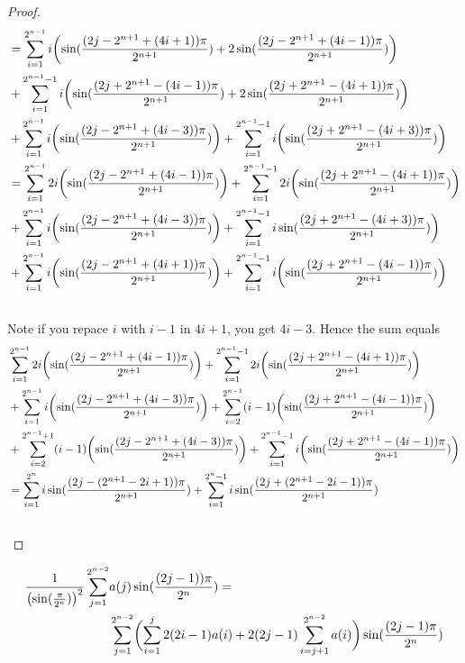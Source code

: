 \documentclass[fleqn,a4paper,9pt]{article}
\begin{document}
\begin{flushleft}
\begin{proof}
\begin{align}
&=\sum_{i=1}^{2^{n-1}}i\biggl(\sin(\frac{(2j-2^{n+1}+(4i+1))\pi}{2^{n+1}})+2\sin(\frac{(2j-2^{n+1}+(4i-1))\pi}{2^{n+1}})\biggr)\\\notag
&+\sum_{i=1}^{2^{n-1}-1}i\biggl(\sin(\frac{(2j+2^{n+1}-(4i-1))\pi}{2^{n+1}})+2\sin(\frac{(2j+2^{n+1}-(4i+1))\pi}{2^{n+1}})\biggr)\\\notag
&+\sum_{i=1}^{2^{n-1}}i\biggl(\sin(\frac{(2j-2^{n+1}+(4i-3))\pi}{2^{n+1}})\biggr)+\sum_{i=1}^{2^{n-1}-1}i\biggl(\sin(\frac{(2j+2^{n+1}-(4i+3))\pi}{2^{n+1}})\biggr)\\\notag
&=\sum_{i=1}^{2^{n-1}}2i\biggl(\sin(\frac{(2j-2^{n+1}+(4i-1))\pi}{2^{n+1}})\biggr)+\sum_{i=1}^{2^{n-1}-1}2i\biggl(\sin(\frac{(2j+2^{n+1}-(4i+1))\pi}{2^{n+1}})\biggr)\\\notag
&+\sum_{i=1}^{2^{n-1}}i\biggl(\sin(\frac{(2j-2^{n+1}+(4i-3))\pi}{2^{n+1}})\biggr)+\sum_{i=1}^{2^{n-1}-1}i\sin(\frac{(2j+2^{n+1}-(4i+3))\pi}{2^{n+1}})\biggr)\\\notag
&+\sum_{i=1}^{2^{n-1}}i\biggl(\sin(\frac{(2j-2^{n+1}+(4i+1))\pi}{2^{n+1}})\biggr)+\sum_{i=1}^{2^{n-1}-1}i\biggl(\sin(\frac{(2j+2^{n+1}-(4i-1))\pi}{2^{n+1}})\biggr)\\\notag
\end{align}
Note if you repace $i$ with $i-1$ in $4i+1$, you get $4i-3$. 
Hence the sum equals
\begin{align}
&\sum_{i=1}^{2^{n-1}}2i\biggl(\sin(\frac{(2j-2^{n+1}+(4i-1))\pi}{2^{n+1}})\biggr)+\sum_{i=1}^{2^{n-1}-1}2i\biggl(\sin(\frac{(2j+2^{n+1}-(4i+1))\pi}{2^{n+1}})\biggr)\\\notag
&+\sum_{i=1}^{2^{n-1}}i\biggl(\sin(\frac{(2j-2^{n+1}+(4i-3))\pi}{2^{n+1}})\biggr)+\sum_{i=2}^{2^{n-1}}(i-1)\biggl(\sin(\frac{(2j+2^{n+1}-(4i-1))\pi}{2^{n+1}})\biggr)\\\notag
&+\sum_{i=2}^{2^{n-1}+1}(i-1)\biggl(\sin(\frac{(2j-2^{n+1}+(4i-3))\pi}{2^{n+1}})\biggr)+\sum_{i=1}^{2^{n-1}-1}i\biggl(\sin(\frac{(2j+2^{n+1}-(4i-1))\pi}{2^{n+1}})\biggr)\\\notag
&=\sum_{i=1}^{2^{n}}i\sin(   \frac{(2j-(2^{n+1}-2i+1))\pi}{2^{n+1}}  )+\sum_{i=1}^{2^{n}-1}i\sin(   \frac{(2j+(2^{n+1}-2i-1))\pi}{2^{n+1}}  )\\\notag
\end{align}
\end{proof}
\begin{corollary}
\begin{align}
\frac{1}{\left(\sin(\frac{\pi}{2^n})\right)^2}\sum_{j=1}^{2^{n-2}}&a(j)\sin(\frac{(2j-1))\pi}{2^n})=\\\notag
&\sum_{j=1}^{2^{n-2}}\biggl(\sum_{i=1}^j2(2i-1)a(i)+2(2j-1)\sum_{i=j+1}^{2^{n-2}}a(i)\biggr)\sin(\frac{(2j-1)\pi}{2^n})\\\notag

\end{align}
\end{corollary}
\end{flushleft}
\end{document}
